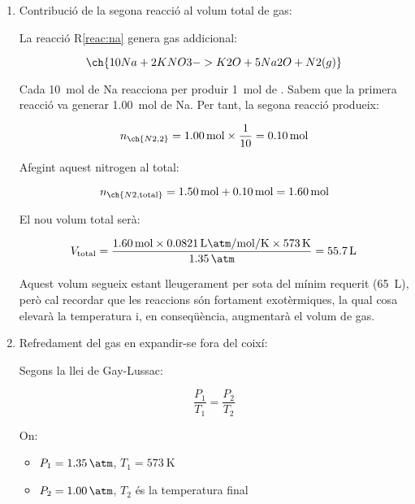 {\begin{enumerate}
    \item Contribució de la segona reacció al volum total de gas:
    
    La reacció R\ref{reac:na} genera gas addicional:  
    
    \begin{equation}
        \ch{10 Na + 2 KNO3 -> K2O + 5 Na2O + N2 (g)}
    \end{equation}
    
    Cada \qty{10}{\mol} de Na reacciona per produir \qty{1}{\mol} de . Sabem que la primera reacció va generar \qty{1.00}{\mol} de Na. Per tant, la segona reacció produeix:  
    
    \begin{equation}
        n_{\ch{N2,2}} = \qty{1.00}{\mol} \times \frac{1}{10} = \qty{0.10}{\mol}
    \end{equation}
    
    Afegint aquest nitrogen al total:  
    
    \begin{equation}
        n_{\ch{N2,\text{total}}} = \qty{1.50}{\mol} + \qty{0.10}{\mol} = \qty{1.60}{\mol}
    \end{equation}
    
    El nou volum total serà:  
    
    \begin{equation}
        V_{\text{total}} = \frac{\qty{1.60}{\mol} \times \qty{0.0821}{\liter\atm\per\mol\per\kelvin} \times \qty{573}{\kelvin}}{\qty{1.35}{\atm}} = \qty{55.7}{\liter}
    \end{equation}
    
    Aquest volum segueix estant lleugerament per sota del mínim requerit (\qty{65}{\liter}), però cal recordar que les reaccions són fortament exotèrmiques, la qual cosa elevarà la temperatura i, en conseqüència, augmentarà el volum de gas.
    
    \item Refredament del gas en expandir-se fora del coixí:
    
    Segons la llei de Gay-Lussac:
    
    \begin{equation}
        \frac{P_1}{T_1} = \frac{P_2}{T_2}
    \end{equation}
    
    On:
    \begin{itemize}
        \item $P_1 = \qty{1.35}{\atm}$, $T_1 = \qty{573}{\kelvin}$
        \item $P_2 = \qty{1.00}{\atm}$, $T_2$ és la temperatura final
    \end{itemize}
    

\end{enumerate}}
